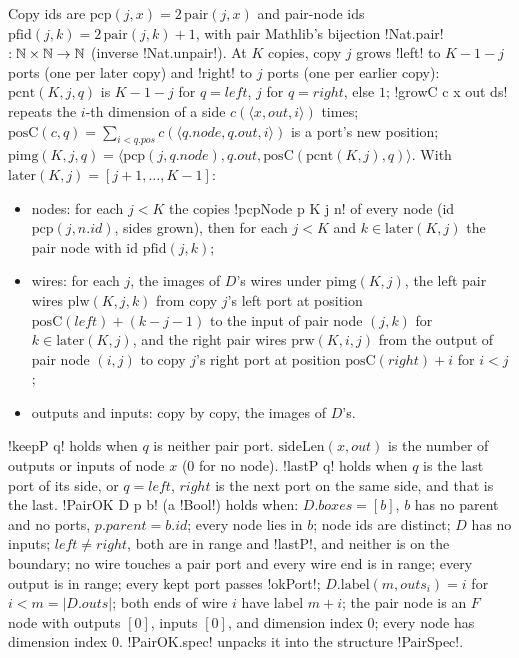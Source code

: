 {\begin{definition}\label{def:boxes-expandPair}
Copy ids are $\mathrm{pcp}(j,x)=2\,\mathrm{pair}(j,x)$ and pair-node ids $\mathrm{pfid}(j,k)=2\,\mathrm{pair}(j,k)+1$, with $\mathrm{pair}$ Mathlib's bijection \lbx!Nat.pair! $:\mathbb{N}\times\mathbb{N}\to\mathbb{N}$ (inverse \lbx!Nat.unpair!). At $K$ copies, copy $j$ grows \lbx!left! to $K-1-j$ ports (one per later copy) and \lbx!right! to $j$ ports (one per earlier copy): $\mathrm{pcnt}(K,j,q)$ is $K-1-j$ for $q=\mathit{left}$, $j$ for $q=\mathit{right}$, else $1$; \lbx!growC c x out ds! repeats the $i$-th dimension of a side $c(\langle x,\mathit{out},i\rangle)$ times; $\mathrm{posC}(c,q)=\sum_{i<q.\mathit{pos}}c(\langle q.\mathit{node},q.\mathit{out},i\rangle)$ is a port's new position; $\mathrm{pimg}(K,j,q)=\langle\mathrm{pcp}(j,q.\mathit{node}),q.\mathit{out},\mathrm{posC}(\mathrm{pcnt}(K,j),q)\rangle$. With $\mathrm{later}(K,j)=[j+1,\ldots,K-1]$:
\begin{itemize}
\item nodes: for each $j<K$ the copies \lbx!pcpNode p K j n! of every node (id $\mathrm{pcp}(j,n.\mathit{id})$, sides grown), then for each $j<K$ and $k\in\mathrm{later}(K,j)$ the pair node with id $\mathrm{pfid}(j,k)$;
\item wires: for each $j$, the images of $D$'s wires under $\mathrm{pimg}(K,j)$, the left pair wires $\mathrm{plw}(K,j,k)$ from copy $j$'s left port at position $\mathrm{posC}(\mathit{left})+(k-j-1)$ to the input of pair node $(j,k)$ for $k\in\mathrm{later}(K,j)$, and the right pair wires $\mathrm{prw}(K,i,j)$ from the output of pair node $(i,j)$ to copy $j$'s right port at position $\mathrm{posC}(\mathit{right})+i$ for $i<j$;
\item outputs and inputs: copy by copy, the images of $D$'s.
\end{itemize}
\end{definition}

\begin{definition}\label{def:boxes-pairOK}
\lbx!keepP q! holds when $q$ is neither pair port. $\mathrm{sideLen}(x,\mathit{out})$ is the number of outputs or inputs of node $x$ ($0$ for no node). \lbx!lastP q! holds when $q$ is the last port of its side, or $q=\mathit{left}$, $\mathit{right}$ is the next port on the same side, and that is the last. \lbx!PairOK D p b! (a \lbx!Bool!) holds when: $D.\mathit{boxes}=[b]$, $b$ has no parent and no ports, $p.\mathit{parent}=b.\mathit{id}$; every node lies in $b$; node ids are distinct; $D$ has no inputs; $\mathit{left}\ne\mathit{right}$, both are in range and \lbx!lastP!, and neither is on the boundary; no wire touches a pair port and every wire end is in range; every output is in range; every kept port passes \lbx!okPort!; $D.\mathrm{label}(m,\mathit{outs}_i)=i$ for $i<m=|D.\mathit{outs}|$; both ends of wire $i$ have label $m+i$; the pair node is an $F$ node with outputs $[0]$, inputs $[0]$, and dimension index $0$; every node has dimension index $0$. \lbx!PairOK.spec! unpacks it into the structure \lbx!PairSpec!.
\end{definition}

}
